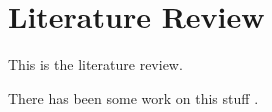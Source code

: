 \chapter{Literature Review}\label{ch:lit_rev}

This is the literature review.

There has been some work on this stuff \citep{ward2016dynamic,wang2015data}.
